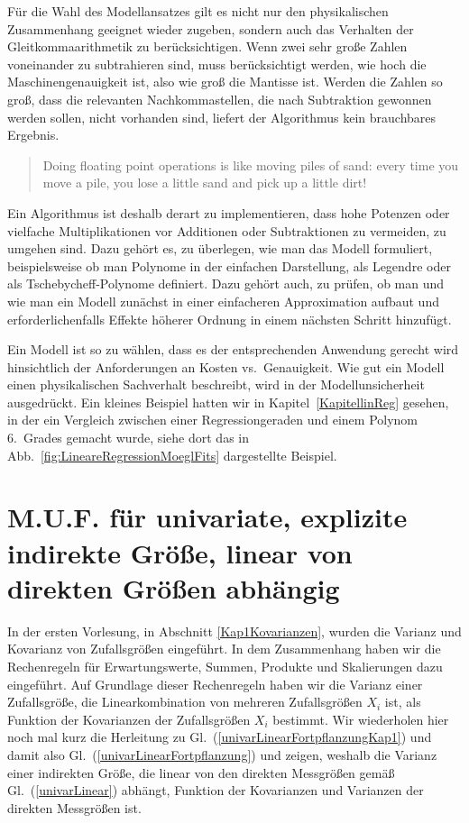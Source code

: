Für die Wahl des Modellansatzes gilt es nicht nur den physikalischen Zusammenhang
geeignet wieder zugeben, sondern auch das Verhalten der Gleitkommaarithmetik zu
berücksichtigen. Wenn zwei sehr große Zahlen voneinander zu subtrahieren sind, muss
berücksichtigt werden, wie hoch die Maschinengenauigkeit ist, also wie groß die
Mantisse ist. Werden die Zahlen so groß, dass die relevanten Nachkommastellen, die
nach Subtraktion gewonnen werden sollen, nicht vorhanden sind, liefert der Algorithmus
kein brauchbares Ergebnis.
\begin{quote}
Doing floating point operations is like moving piles of sand: every
time you move a pile, you lose a little sand and pick up a little dirt!
\end{quote}
Ein Algorithmus ist deshalb derart zu implementieren, dass hohe Potenzen oder
vielfache Multiplikationen vor Additionen oder Subtraktionen zu vermeiden, zu umgehen
sind. Dazu gehört es, zu überlegen, wie man das Modell formuliert, beispielsweise
ob man Polynome in der einfachen Darstellung, als Legendre oder als Tschebycheff-Polynome
definiert. Dazu gehört auch, zu prüfen, ob man und wie man ein Modell zunächst in einer
einfacheren Approximation aufbaut und erforderlichenfalls Effekte höherer Ordnung in
einem nächsten Schritt hinzufügt.

Ein Modell ist so zu wählen, dass es der entsprechenden Anwendung gerecht wird
hinsichtlich der Anforderungen an Kosten vs.\ Genauigkeit. Wie gut ein Modell einen
physikalischen Sachverhalt beschreibt, wird in der Modellunsicherheit ausgedrückt.
Ein kleines Beispiel hatten wir in Kapitel~\ref{KapitellinReg} gesehen, in der ein Vergleich
zwischen einer Regressiongeraden und einem Polynom 6.\ Grades gemacht wurde, siehe
dort das in Abb.~\ref{fig:LineareRegressionMoeglFits} dargestellte Beispiel.


\section{M.U.F. für univariate, explizite indirekte Größe, linear von direkten Größen abhängig}


In der ersten Vorlesung, in Abschnitt \ref{Kap1Kovarianzen}, wurden die Varianz und Kovarianz
von Zufallsgrößen eingeführt. In dem Zusammenhang haben wir die Rechenregeln für Erwartungswerte,
Summen, Produkte und Skalierungen dazu eingeführt. Auf Grundlage dieser Rechenregeln haben
wir die Varianz einer Zufallsgröße, die Linearkombination von mehreren Zufallsgrößen $X_i$ ist,
als Funktion der Kovarianzen der Zufallsgrößen $X_i$ bestimmt.
Wir wiederholen hier noch mal kurz die Herleitung zu Gl.~(\ref{univarLinearFortpflanzungKap1})
und damit also Gl.~(\ref{univarLinearFortpflanzung}) und zeigen,
weshalb die Varianz einer indirekten Größe, die linear
von den direkten Messgrößen gemäß Gl.~(\ref{univarLinear}) abhängt, Funktion der Kovarianzen
und Varianzen der direkten Messgrößen ist.

